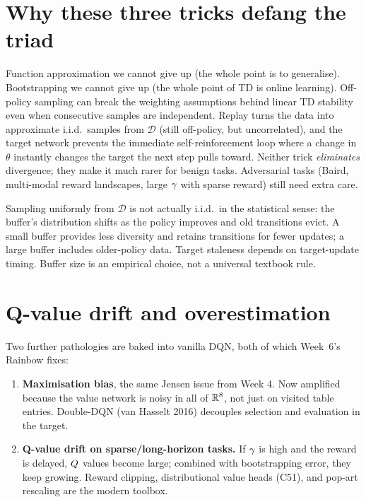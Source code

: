 \documentclass[11pt,oneside]{scrbook}
\begin{document}
\section{Why these three tricks defang the triad}

Function approximation we cannot give up (the whole point is to generalise). Bootstrapping
we cannot give up (the whole point of TD is online learning). Off-policy sampling can break the weighting assumptions behind linear
TD stability even when consecutive samples are independent. Replay turns the data into approximate i.i.d.\
samples from $\mathcal{D}$ (still off-policy, but uncorrelated), and the target network
prevents the immediate self-reinforcement loop where a change in $\theta$ instantly
changes the target the next step pulls toward. Neither trick \emph{eliminates} divergence;
they make it much rarer for benign tasks. Adversarial tasks (Baird, multi-modal reward
landscapes, large $\gamma$ with sparse reward) still need extra care.

\begin{pitfall}
Sampling uniformly from $\mathcal{D}$ is not actually i.i.d.\ in the statistical sense:
the buffer's distribution shifts as the policy improves and old transitions evict. A small buffer provides less diversity and retains transitions for fewer
updates; a large buffer includes older-policy data. Target staleness depends
on target-update timing. Buffer size is an empirical choice, not a universal
textbook rule.
\end{pitfall}

\section{Q-value drift and overestimation}

Two further pathologies are baked into vanilla DQN, both of which Week~6's Rainbow fixes:

\begin{enumerate}
  \item \textbf{Maximisation bias}, the same Jensen issue from Week 4. Now amplified
    because the value network is noisy in all of $\mathbb{R}^8$, not just on visited table
    entries. Double-DQN (van Hasselt 2016) decouples selection and evaluation in the
    target.
  \item \textbf{Q-value drift on sparse/long-horizon tasks.} If $\gamma$ is high and the
    reward is delayed, $Q$ values become large; combined with bootstrapping error,
    they keep growing. Reward clipping, distributional value heads (C51), and pop-art
    rescaling are the modern toolbox.
\end{enumerate}
\end{document}
